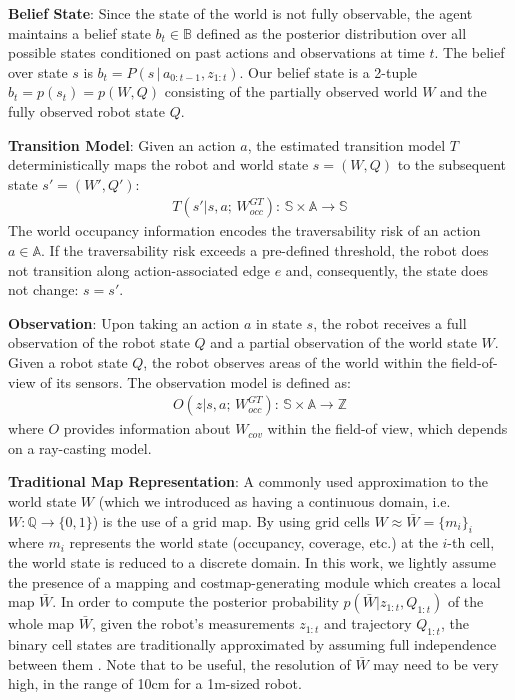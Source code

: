 \documentclass{article}
\newcommand{\ph}[1]{{\textbf{#1}:}} %
\begin{document}
\ph{Belief State} Since the state of the world is not fully observable, the agent maintains a belief state $b_t\in \mathbb{B}$ defined as the posterior distribution over all possible states conditioned on past actions and observations at time $t$. The belief over state $s$ is $b_{t} = P(s \,|\, a_{0:t-1}, z_{1:t})$. Our belief state is a 2-tuple $b_t = p(s_t) = p(W,Q)$ consisting of the partially observed world $W$ and the fully observed robot state $Q$.


\ph{Transition Model} Given an action $a$, the estimated transition model $T$ deterministically maps the robot and world state $s = (W, Q)$ to the subsequent state $s' = (W', Q')$:
\begin{align}
    T(s' | s, a; \, W_{occ}^{GT}): \, \mathbb{S} \times \mathbb{A} \rightarrow \mathbb{S}
\end{align}
The world occupancy information encodes the traversability risk of an action $a \in \mathbb{A}$. If the traversability risk exceeds a pre-defined threshold, the robot does not transition along action-associated edge $e$ and, consequently, the state does not change: $s = s'$.

\ph{Observation} Upon taking an action $a$ in state $s$, the robot receives a full observation of the robot state $Q$ and a partial observation of the world state $W$.  Given a robot state $Q$, the robot observes areas of the world within the field-of-view of its sensors.  The observation model is defined as:
\begin{align}
   O(z | s, a; \, W_{occ}^{GT}): \, \mathbb{S} \times \mathbb{A} \rightarrow \mathbb{Z}
\end{align}
where $O$ provides information about $W_{cov}$ within the field-of view, which depends on a ray-casting model.

\ph{Traditional Map Representation} A commonly used approximation to the world state $W$ (which we introduced as having a continuous domain, i.e. $W:\mathbb{Q}\rightarrow \{0,1\}$) is the use of a grid map.  By using grid cells $W\approx\bar{W}=\{m_i\}_i$ where $m_i$ represents the world state (occupancy, coverage, etc.) at the $i$-th cell, the world state is reduced to a discrete domain.  In this work, we lightly assume the presence of a mapping and costmap-generating module which creates a local map $\bar{W}$.  
In order to compute the posterior probability $p(\bar{W} | z_{1:t}, Q_{1:t})$ of the whole map $\bar{W}$, given the robot's measurements $z_{1:t}$ and trajectory $Q_{1:t}$, the binary cell states are traditionally approximated by assuming full independence between them \cite{TBF05,elfes1990stochastic}.  Note that to be useful, the resolution of $\bar{W}$ may need to be very high, in the range of 10cm for a 1m-sized robot.  
\end{document}

